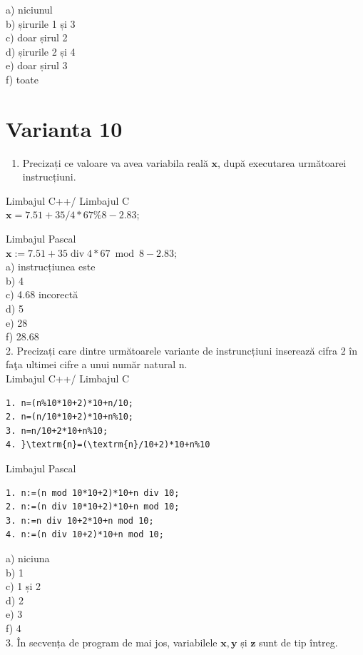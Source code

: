 \documentclass[10pt]{article}
\begin{document}
a) niciunul\\
b) șirurile 1 și 3\\
c) doar șirul 2\\
d) șirurile 2 și 4\\
e) doar șirul 3\\
f) toate

\section*{Varianta 10}
\begin{enumerate}
  \item Precizați ce valoare va avea variabila reală $\mathbf{x}$, după executarea următoarei instrucțiuni.
\end{enumerate}

Limbajul C++/ Limbajul C\\
$\mathbf{x}=7.51+35 / 4 * 67 \% 8-2.83$;

Limbajul Pascal\\
$\mathbf{x}:=7.51+35 \operatorname{div} 4 * 67 \bmod 8-2.83 ;$\\
a) instrucțiunea este\\
b) 4\\
c) 4.68 incorectă\\
d) 5\\
e) 28\\
f) 28.68\\
2. Precizați care dintre următoarele variante de instruncțiuni inserează cifra 2 în faţa ultimei cifre a unui număr natural n.\\
Limbajul C++/ Limbajul C

\begin{verbatim}
1. n=(n%10*10+2)*10+n/10;
2. n=(n/10*10+2)*10+n%10;
3. n=n/10+2*10+n%10;
4. }\textrm{n}=(\textrm{n}/10+2)*10+n%10
\end{verbatim}

Limbajul Pascal

\begin{verbatim}
1. n:=(n mod 10*10+2)*10+n div 10;
2. n:=(n div 10*10+2)*10+n mod 10;
3. n:=n div 10+2*10+n mod 10;
4. n:=(n div 10+2)*10+n mod 10;
\end{verbatim}

a) niciuna\\
b) 1\\
c) 1 și 2\\
d) 2\\
e) 3\\
f) 4\\
3. În secvența de program de mai jos, variabilele $\mathbf{x}, \mathbf{y}$ și $\mathbf{z}$ sunt de tip întreg.
\end{document}
